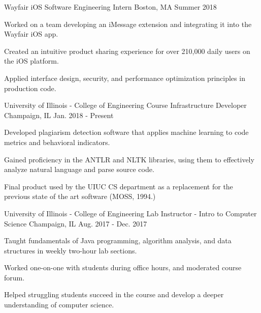 
\begin{cventries}
\cventry
{Wayfair} %
{iOS Software Engineering Intern} %
{Boston, MA} %
{Summer 2018} %
{
	\begin{cvitems} %
		\item {Worked on a team developing an iMessage extension and integrating it into the Wayfair iOS app.}
		\item {Created an intuitive product sharing experience for over 210,000 daily users on the iOS platform.}
		\item {Applied interface design, security, and performance optimization principles in production code.}
	\end{cvitems}
}
\cventry
{University of Illinois - College of Engineering} %
{Course Infrastructure Developer} %
{Champaign, IL} %
{Jan. 2018 - Present} %
{
    \begin{cvitems} %
        \item {Developed plagiarism detection software that applies machine learning to code metrics and behavioral indicators.}
        \item {Gained proficiency in the ANTLR and NLTK libraries, using them to effectively analyze natural language and parse source code.}
       \item {Final product used by the UIUC CS department as a replacement for the previous state of the art software (MOSS, 1994.)}
    \end{cvitems}
}
\cventry
{University of Illinois - College of Engineering} %
{Lab Instructor - Intro to Computer Science} %
{Champaign, IL} %
{Aug. 2017 - Dec. 2017} %
{
	\begin{cvitems} %
		\item {Taught fundamentals of Java programming, algorithm analysis, and data structures in weekly two-hour lab sections.}
		\item {Worked one-on-one with students during office hours, and moderated course forum.}
		\item {Helped struggling students succeed in the course and develop a deeper understanding of computer science.}
	\end{cvitems}
}
\end{cventries}
